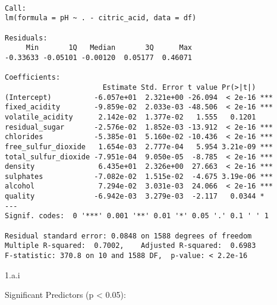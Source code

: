 \documentclass[
  12pt,
  letterpaper,
  DIV=11,
  numbers=noendperiod]{scrartcl}
\newenvironment{Shaded}{\begin{snugshade}}{\end{snugshade}}
\newcommand{\AttributeTok}[1]{\textcolor[rgb]{0.40,0.45,0.13}{#1}}
\newcommand{\CommentTok}[1]{\textcolor[rgb]{0.37,0.37,0.37}{#1}}
\newcommand{\FloatTok}[1]{\textcolor[rgb]{0.68,0.00,0.00}{#1}}
\newcommand{\FunctionTok}[1]{\textcolor[rgb]{0.28,0.35,0.67}{#1}}
\newcommand{\NormalTok}[1]{\textcolor[rgb]{0.00,0.23,0.31}{#1}}
\newcommand{\OtherTok}[1]{\textcolor[rgb]{0.00,0.23,0.31}{#1}}
\newcommand{\SpecialCharTok}[1]{\textcolor[rgb]{0.37,0.37,0.37}{#1}}
\newcommand{\StringTok}[1]{\textcolor[rgb]{0.13,0.47,0.30}{#1}}
\begin{document}
\begin{verbatim}

Call:
lm(formula = pH ~ . - citric_acid, data = df)

Residuals:
     Min       1Q   Median       3Q      Max 
-0.33633 -0.05101 -0.00120  0.05177  0.46071 

Coefficients:
                       Estimate Std. Error t value Pr(>|t|)    
(Intercept)          -6.057e+01  2.321e+00 -26.094  < 2e-16 ***
fixed_acidity        -9.859e-02  2.033e-03 -48.506  < 2e-16 ***
volatile_acidity      2.142e-02  1.377e-02   1.555   0.1201    
residual_sugar       -2.576e-02  1.852e-03 -13.912  < 2e-16 ***
chlorides            -5.385e-01  5.160e-02 -10.436  < 2e-16 ***
free_sulfur_dioxide   1.654e-03  2.777e-04   5.954 3.21e-09 ***
total_sulfur_dioxide -7.951e-04  9.050e-05  -8.785  < 2e-16 ***
density               6.435e+01  2.326e+00  27.663  < 2e-16 ***
sulphates            -7.082e-02  1.515e-02  -4.675 3.19e-06 ***
alcohol               7.294e-02  3.031e-03  24.066  < 2e-16 ***
quality              -6.942e-03  3.279e-03  -2.117   0.0344 *  
---
Signif. codes:  0 '***' 0.001 '**' 0.01 '*' 0.05 '.' 0.1 ' ' 1

Residual standard error: 0.0848 on 1588 degrees of freedom
Multiple R-squared:  0.7002,    Adjusted R-squared:  0.6983 
F-statistic: 370.8 on 10 and 1588 DF,  p-value: < 2.2e-16
\end{verbatim}

1.a.i

Significant Predictors (p \textless{} 0.05):

\begin{Shaded}
\end{Shaded}
\end{document}
